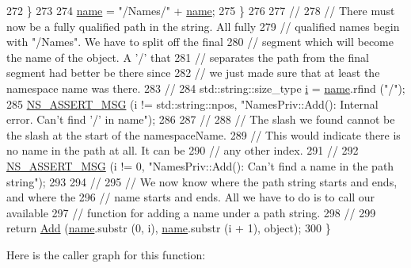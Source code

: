 \begin{DoxyCode}
272         \}
273 
274       \hyperlink{generate__test__data__lte__spectrum__model_8m_ab74e6bf80237ddc4109968cedc58c151}{name} = \textcolor{stringliteral}{"/Names/"} + \hyperlink{generate__test__data__lte__spectrum__model_8m_ab74e6bf80237ddc4109968cedc58c151}{name};
275     \}
276 
277   \textcolor{comment}{//}
278   \textcolor{comment}{// There must now be a fully qualified path in the string.  All fully }
279   \textcolor{comment}{// qualified names begin with "/Names".  We have to split off the final }
280   \textcolor{comment}{// segment which will become the name of the object.  A '/' that}
281   \textcolor{comment}{// separates the path from the final segment had better be there since}
282   \textcolor{comment}{// we just made sure that at least the namespace name was there.}
283   \textcolor{comment}{//}
284   std::string::size\_type \hyperlink{bernuolliDistribution_8m_a6f6ccfcf58b31cb6412107d9d5281426}{i} = \hyperlink{generate__test__data__lte__spectrum__model_8m_ab74e6bf80237ddc4109968cedc58c151}{name}.rfind (\textcolor{stringliteral}{"/"});
285   \hyperlink{assert_8h_aff5ece9066c74e681e74999856f08539}{NS\_ASSERT\_MSG} (i != std::string::npos, \textcolor{stringliteral}{"NamesPriv::Add(): Internal error.  Can't find '/' in
       name"});
286 
287   \textcolor{comment}{//}
288   \textcolor{comment}{// The slash we found cannot be the slash at the start of the namespaceName.}
289   \textcolor{comment}{// This would indicate there is no name in the path at all.  It can be}
290   \textcolor{comment}{// any other index.}
291   \textcolor{comment}{//}
292   \hyperlink{assert_8h_aff5ece9066c74e681e74999856f08539}{NS\_ASSERT\_MSG} (i != 0, \textcolor{stringliteral}{"NamesPriv::Add(): Can't find a name in the path string"});
293 
294   \textcolor{comment}{//}
295   \textcolor{comment}{// We now know where the path string starts and ends, and where the}
296   \textcolor{comment}{// name starts and ends.  All we have to do is to call our available}
297   \textcolor{comment}{// function for adding a name under a path string.}
298   \textcolor{comment}{//}
299   \textcolor{keywordflow}{return} \hyperlink{classns3_1_1NamesPriv_a1d9bc7794dedbcb88c7f875c084761bb}{Add} (\hyperlink{generate__test__data__lte__spectrum__model_8m_ab74e6bf80237ddc4109968cedc58c151}{name}.substr (0, i), \hyperlink{generate__test__data__lte__spectrum__model_8m_ab74e6bf80237ddc4109968cedc58c151}{name}.substr (i + 1), object);
300 \}
\end{DoxyCode}


Here is the caller graph for this function\+:


